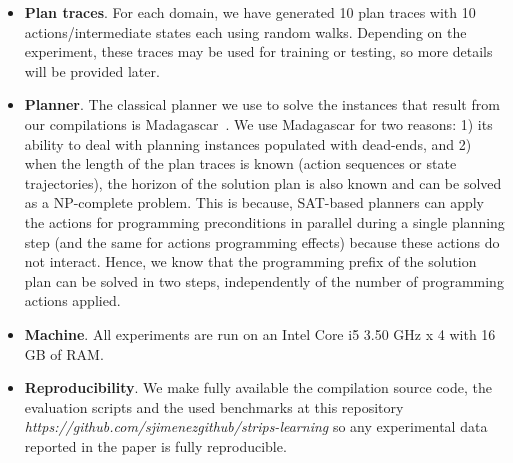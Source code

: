 \begin{itemize}

\item {\bf Plan traces}. For each domain, we have generated 10 plan traces with 10 actions/intermediate states each using random walks. Depending on the experiment, these traces may be used for training or testing, so more details will be provided later.

\item {\bf Planner}. The classical planner we use to solve the instances that result from our compilations is {\sc Madagascar}~\cite{rintanen2014madagascar}. We use {\sc Madagascar} for two reasons: 1) its ability to deal with planning instances populated with dead-ends, and 2) when the length of the plan traces is known (\FO action sequences or \FO state trajectories), the horizon of the solution plan is also known and can be solved as a NP-complete problem. This is because, SAT-based planners can apply the actions for programming preconditions in parallel during a single planning step (and the same for actions programming effects) because these actions do not interact. Hence, we know that the programming prefix of the solution plan can be solved in two steps, independently of the number of programming actions applied.

\item {\bf Machine}. All experiments are run on an Intel Core i5 3.50 GHz x 4 with 16 GB of RAM.

\item {\bf Reproducibility}. We make fully available the compilation source code, the evaluation scripts and the used benchmarks at this repository {\em https://github.com/sjimenezgithub/strips-learning} so any experimental data reported in the paper is fully reproducible.
\end{itemize}

